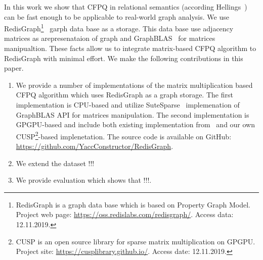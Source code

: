 In this work we show that CFPQ in relational semantics (according Hellings~\cite{hellingsRelational}) can be fast enough to be applicable to real-world graph analysis.
We use RedisGraph\footnote{RedisGraph is a graph data base which is based on Property Graph Model. Project web page: \url{https://oss.redislabs.com/redisgraph/}. Access data: 12.11.2019.}~\cite{8778293} garph data base as a storage.
This data base use adjacency matrices as arepresenataion of graph and GraphBLAS~\cite{7761646} for matrices manipualtion.
These facts allow us to integrate matrix-based CFPQ algorithm to RedisGraph with minimal effort.
We make the following contributions in this paper.
\begin{enumerate}
\item We provide a number of implementations of the matrix multiplication based CFPQ algorithm which uses RedisGraph as a graph storage.
The first implementation is CPU-based and utilize SuteSparse~\cite{!!!} implemenation of GraphBLAS API for matrices manipulation.
The second implementation is GPGPU-based and include both existing implementation from~\cite{!!!} and our own CUSP\footnote{CUSP is an open source library for sparse matrix multiplication on GPGPU. Project site: \url{https://cusplibrary.github.io/}. Access date: 12.11.2019.}-based implenetation.
The source code is available on GitHub: \url{https://github.com/YaccConstructor/RedisGraph}.
\item We extend the dataset !!!
\item We provide evaluation which shows that !!!.
\end{enumerate}
